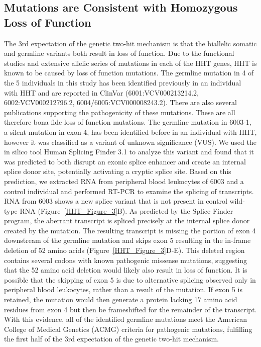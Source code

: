 \subsection{Mutations are Consistent with Homozygous Loss of Function}
The 3rd expectation of the genetic two-hit mechanism is that the biallelic somatic and germline variants both result in loss of function. Due to the functional studies and extensive allelic series of mutations in each of the HHT genes, HHT is known to be caused by loss of function mutations.   The germline mutation in 4 of the 5 individuals in this study has been identified previously in an individual with HHT and are reported in ClinVar (6001:VCV000213214.2, 6002:VCV000212796.2, 6004/6005:VCV000008243.2).   There are also several publications supporting the pathogenicity of these mutations.\citep{johnson1995, bossler2006, gallione1998, ricard2010, olivieri2007}  These are all therefore bona fide loss of function mutations.  The germline mutation in 6003-1, a silent mutation in  exon 4, has been identified before in an individual with HHT, however it was classified as a variant of unknown significance (VUS). We used the in silico tool Human Splicing Finder 3.1\citep{desmet2009} to analyze this variant and found that it was predicted to both disrupt an exonic splice enhancer and create an internal splice donor site, potentially activating a cryptic splice site. Based on this prediction, we extracted RNA from peripheral blood leukocytes of 6003 and a control individual and performed RT-PCR to examine the splicing of  transcripts. RNA from 6003 shows a new splice variant that is not present in control wild-type RNA (Figure~\ref{HHT_Figure_3}B). As predicted by the Splice Finder program, the aberrant transcript is spliced precisely at the internal splice donor created by the mutation. The resulting transcript is missing the portion of exon 4 downstream of the germline mutation and skips exon 5 resulting in the in-frame deletion of 52 amino acids (Figure~\ref{HHT_Figure_3}D-E). This deleted region contains several codons with known pathogenic missense mutations, suggesting that the 52 amino acid deletion would likely also result in loss of function. It is possible that the skipping of exon 5 is due to alternative splicing observed only in peripheral blood leukocytes, rather than a result of the mutation. If exon 5 is retained, the mutation would then generate a protein lacking 17 amino acid residues from exon 4 but then be frameshifted for the remainder of the transcript.  With this evidence, all of the identified germline mutations meet the American College of Medical Genetics (ACMG) criteria for pathogenic mutations\citep{richards2015}, fulfilling the first half of the 3rd expectation of the genetic two-hit mechanism.  

